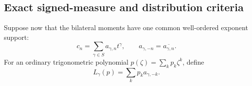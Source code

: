 \documentclass[11pt,letterpaper]{article}
\theoremstyle{definition}
\numberwithin{equation}{section}
\begin{document}
\subsection{Exact signed-measure and distribution criteria}

Suppose now that the bilateral moments have one common well-ordered exponent support:
\begin{equation}\label{herg:eq:commonmoments}
 c_n=\sum_{\gamma\in S}a_{\gamma,n}t^\gamma,
 \qquad a_{\gamma,-n}=\overline{a_{\gamma,n}}.
\end{equation}
For an ordinary trigonometric polynomial $p(\zeta)=\sum_kp_k\zeta^k$, define
\begin{equation}\label{herg:eq:coefficientfunctional}
 L_\gamma(p)=\sum_kp_k a_{\gamma,-k}.
\end{equation}
\end{document}
